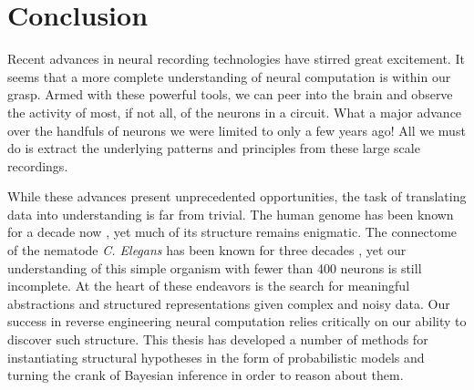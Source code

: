 \chapter{Conclusion}
\label{conclusion}

Recent advances in neural recording technologies have stirred great
excitement. It seems that a more complete understanding of neural
computation is within our grasp. Armed with these powerful tools, we
can peer into the brain and observe the activity of most, if not all,
of the neurons in a circuit. What a major advance over the handfuls
of neurons we were limited to only a few years ago! All we must do
is extract the underlying patterns and principles from these
large scale recordings.

While these advances present unprecedented opportunities, the task of
translating data into understanding is far from trivial. The human
genome has been known for a decade now \citep{international2004finishing, gregory2006dna}, yet much of its structure
remains enigmatic. The connectome of the nematode \textit{C. Elegans}
has been known for three decades \citep{white1986structure}, yet our
understanding of this simple organism with fewer than 400 neurons is
still incomplete. At the heart of these endeavors is the search for
meaningful abstractions and structured representations given complex
and noisy data. Our success in reverse engineering neural computation
relies critically on our ability to discover such structure. This
thesis has developed a number of methods for instantiating structural
hypotheses in the form of probabilistic models and turning the crank
of Bayesian inference in order to reason about them.



